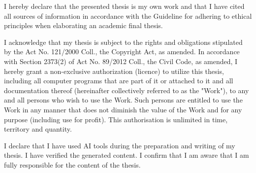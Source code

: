 \documentclass[english,bachelor,unicode,oneside]{ctufit-thesis}
\begin{document}
\begin{declarationpage}
I hereby declare that the presented thesis is my own work and that I have cited all sources of
information in accordance with the Guideline for adhering to ethical principles when elaborating an
academic final thesis.

I acknowledge that my thesis is subject to the rights and obligations stipulated by the Act No.
121/2000 Coll., the Copyright Act, as amended. In accordance with Section 2373(2) of Act No.
89/2012 Coll., the Civil Code, as amended, I hereby grant a non-exclusive authorization (licence) to
utilize this thesis, including all computer programs that are part of it or attached to it and all
documentation thereof (hereinafter collectively referred to as the "Work"), to any and all persons
who wish to use the Work. Such persons are entitled to use the Work in any manner that does not
diminish the value of the Work and for any purpose (including use for profit). This authorisation is
unlimited in time, territory and quantity.

I declare that I have used AI tools during the preparation and writing of my thesis. I have verified
the generated content. I confirm that I am aware that I am fully responsible for the content of the
thesis.
\end{declarationpage}

\printabstractpage %
\end{document}
